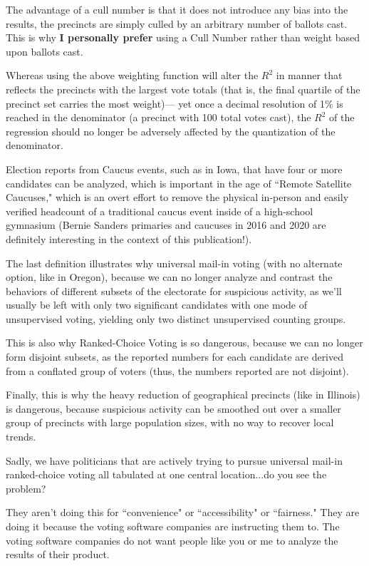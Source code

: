 The advantage of a cull number is that it does not introduce any  bias into the results, the precincts are simply culled by an arbitrary number of ballots cast. This is why \textbf{I personally prefer} using a Cull Number rather than weight based upon ballots cast.

Whereas using the above weighting function will alter the $R^2$ in manner that reflects the precincts with the largest vote totals (that is, the final quartile of the precinct set carries the most weight)--- yet once a decimal resolution of 1\% is reached in the denominator (a precinct with 100 total votes cast), the $R^2$ of the regression should no longer be adversely affected by the quantization of the denominator.

Election reports from Caucus events, such as in Iowa, that have four or more candidates can be analyzed, which is important in the age of ``Remote Satellite Caucuses," which is an overt effort to remove the physical in-person and easily verified headcount of a traditional caucus event inside of a high-school gymnasium (Bernie Sanders primaries and caucuses in 2016 and 2020 are definitely interesting in the context of this publication!).

The last definition illustrates why universal mail-in voting (with no alternate option, like in Oregon), because we can no longer analyze and contrast the behaviors of different subsets of the electorate for suspicious activity, as we'll usually be left with only two significant candidates with one mode of unsupervised voting, yielding only two distinct unsupervised counting groups.

This is also why Ranked-Choice Voting is so dangerous, because we can no longer form disjoint subsets, as the reported numbers for each candidate are derived from a conflated group of voters (thus, the numbers reported are not disjoint).

Finally, this is why the heavy reduction of geographical precincts (like in Illinois) is dangerous, because suspicious activity can be smoothed out over a smaller group of precincts with large population sizes, with no way to recover local trends.

Sadly, we have politicians that are actively trying to pursue universal mail-in ranked-choice voting all tabulated at one central location...do you see the problem? 

They aren't doing this for ``convenience" or ``accessibility" or ``fairness." They are doing it because the voting software companies are instructing them to. The voting software companies do not want people like you or me to analyze the results of their product.
\newpage
